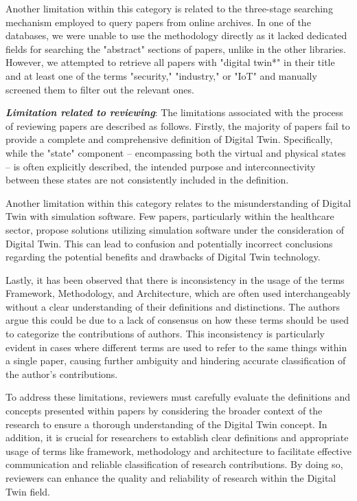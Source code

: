 Another limitation within this category is related to the three-stage searching mechanism employed to query papers from online archives. In one of the databases, we were unable to use the methodology directly as it lacked dedicated fields for searching the "abstract" sections of papers, unlike in the other libraries. However, we attempted to retrieve all papers with "digital twin*" in their title and at least one of the terms "security," "industry," or "IoT" and manually screened them to filter out the relevant ones.

\textbf{\textit{Limitation related to reviewing}}: The limitations associated with the process of reviewing papers are described as follows. Firstly, the majority of papers fail to provide a complete and comprehensive definition of Digital Twin. Specifically, while the "state" component -- encompassing both the virtual and physical states -- is often explicitly described, the intended purpose and interconnectivity between these states are not consistently included in the definition.

Another limitation within this category relates to the  misunderstanding of Digital Twin with simulation software. Few papers, particularly within the healthcare sector, propose solutions utilizing simulation software under the consideration of Digital Twin. This can lead to confusion and potentially incorrect conclusions regarding the potential benefits and drawbacks of Digital Twin technology.

 Lastly, it has been observed that there is inconsistency in the usage of the terms Framework, Methodology, and Architecture, which are often used interchangeably without a clear understanding of their definitions and distinctions. The authors argue this could be due to a lack of consensus on how these terms should be used to categorize the contributions of authors. This inconsistency is particularly evident in cases where different terms are used to refer to the same things within a single paper, causing further ambiguity and hindering accurate classification of the author's contributions.

 To address these limitations, reviewers must carefully evaluate the definitions and concepts presented within papers by considering the broader context of the research to ensure a thorough understanding of the Digital Twin concept. In addition, it is crucial for researchers to establish clear definitions and appropriate usage of terms like framework, methodology and architecture to facilitate effective communication and reliable classification of research contributions. By doing so, reviewers can enhance the quality and reliability of research within the Digital Twin field.


